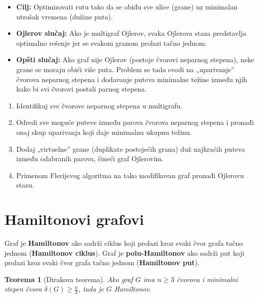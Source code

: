 \documentclass[a4paper,12pt,twoside]{report}
\newtheorem{theorem}{Teorema}[section]
\numberwithin{algorithm}{section}
\begin{document}
\begin{itemize}
    \item \textbf{Cilj:} Optimizovati rutu tako da se obiđu sve ulice (grane) uz minimalan utrošak vremena (dužine puta).
    \item \textbf{Ojlerov slučaj:} Ako je multigraf Ojlerov, svaka Ojlerova staza predstavlja optimalno rešenje jer se svakom granom prolazi tačno jednom.
    \item \textbf{Opšti slučaj:} Ako graf nije Ojlerov (postoje čvorovi neparnog stepena), neke grane se moraju obići više puta. Problem se tada svodi na „uparivanje” čvorova neparnog stepena i dodavanje puteva minimalne težine između njih kako bi svi čvorovi postali parnog stepena.
\end{itemize}



\begin{algorithm}[ht]
    \caption{Rešavanje problema kineskog poštara (za neojlerov graf)}
    \begin{enumerate}
        \item Identifikuj sve čvorove neparnog stepena u multigrafu.
        \item Odredi sve moguće puteve između parova čvorova neparnog stepena i pronađi onaj skup uparivanja koji daje minimalnu ukupnu težinu.
        \item Dodaj „virtuelne” grane (duplikate postojećih grana) duž najkraćih puteva između odabranih parova, čineći graf Ojlerovim.
        \item Primenom Flerijevog algoritma na tako modifikovan graf pronađi Ojlerovu stazu.
    \end{enumerate}
\end{algorithm}

\section{Hamiltonovi grafovi}
Graf je \textbf{Hamiltonov} ako sadrži ciklus koji prolazi kroz svaki čvor grafa tačno jednom (\textbf{Hamiltonov ciklus}). Graf je \textbf{polu-Hamiltonov} ako sadrži put koji prolazi kroz svaki čvor grafa tačno jednom (\textbf{Hamiltonov put}).

\begin{theorem}[Dirakova teorema]
    Ako graf $G$ ima $n \geq 3$ čvorova i minimalni stepen čvora $\delta(G) \geq \frac{n}{2}$, tada je $G$ Hamiltonov.
\end{theorem}
\end{document}

